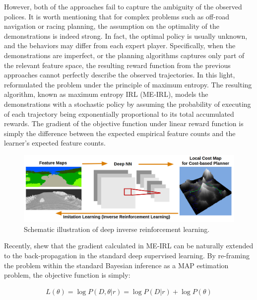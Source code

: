 \documentclass[../thesis.tex]{subfiles}
\begin{document}
However, both of the approaches fail to capture the ambiguity of the observed polices. 
It is worth mentioning that for complex problems such as off-road navigation or racing planning, the assumption on the optimality of the demonstrations is indeed strong. In fact, the optimal policy is usually unknown, and the behaviors may differ from each expert player.
Specifically, when the demonstrations are imperfect, or the planning algorithms captures only part of the relevant feature space, the resulting reward function from the previous approaches cannot perfectly describe the observed trajectories. 
In this light, \citet{ziebart2008maximum} reformulated the problem under the principle of maximum entropy. 
The resulting algorithm, known as maximum entropy IRL (ME-IRL), models the demonstrations with a stochastic policy by assuming the probability of executing of each trajectory being exponentially proportional to its total accumulated rewards. 
The gradient of the objective function under linear reward function is simply the difference between the expected empirical feature counts and the learner's expected feature counts. 



\begin{figure}[t]
	\begin{center}
		\centerline{\includegraphics[width=0.9\columnwidth]{./DIRL/fig/dirl_pipeline.png}}
		\caption{Schematic illustration of deep inverse reinforcement learning.}
		\label{fig:dirl_diagram}
	\end{center}
\end{figure} 

Recently, \citet{wulfmeier2015maximum} shew that the gradient calculated in ME-IRL can be naturally extended to the back-propagation in the standard deep supervised learning. 
By re-framing the problem within the standard Bayesian inference as a MAP estimation problem, the objective function is simply: 

\begin{align}
L(\theta) = \log P(D,\theta|r) = \log P(D|r) + \log P(\theta) \label{equ:dirl_obj}
\end{align}
\end{document}
